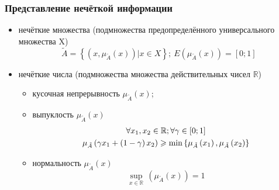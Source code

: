 \documentclass[12pt]{beamer}
\begin{document}
\begin{frame}
  \frametitle{Представление нечёткой информации}
  \begin{itemize}
    \item нечёткие множества (подмножества предопределённого универсального множества X)
      \begin{equation}
      	\tilde{A}=\left\{ \left( x, \mu_{\tilde A}\left( x \right) \right)\left| x\in X \right. \right\};\ E \left( \mu_{\tilde A} \left( x \right) \right) = \left[0; 1 \right]
      \end{equation}      
    \item нечёткие числа (подмножества множества действительных чисел $\mathbb{R}$)
      \begin{itemize}
        \item кусочная непрерывность $\mu_{\tilde A}\left( x \right)$;
        \item выпуклость $\mu_{\tilde A}\left( x \right)$
      	\begin{gather}
      	  \forall x_1, x_2 \in \mathbb{R}; \forall \gamma \in \left[ 0;1 \right] \notag \\
      	  \mu_{\tilde A}\left( \gamma x_1+\left( 1-\gamma  \right)x_2 \right)\geqslant \min \left\{ \mu_{\tilde A}\left( x_1 \right),\mu_{\tilde A}\left( x_2 \right) \right\}
      	\end{gather}
      	\item нормальность $\mu_{\tilde A}\left( x \right)$
        	\begin{equation}
        		\underset{x\in \mathbb{R}}{\mathop {\sup}}{}\, \left( \mu_{\tilde A} \left( x \right) \right)=1
        	\end{equation}
      \end{itemize}
  \end{itemize}
\end{frame}
\end{document}
